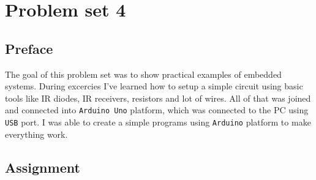 \section{Problem set 4}
\subsection{Preface}

The goal of this problem set was to show practical examples of embedded systems.
During excercies I've learned how to setup a simple circuit using basic tools
like IR diodes, IR receivers, resistors and lot of wires. All of that was joined
and connected into \texttt{Arduino Uno} platform, which was connected to the PC
using \texttt{USB} port. I was able to create a simple programs using
\texttt{Arduino} platform to make everything work.

\subsection{Assignment}
